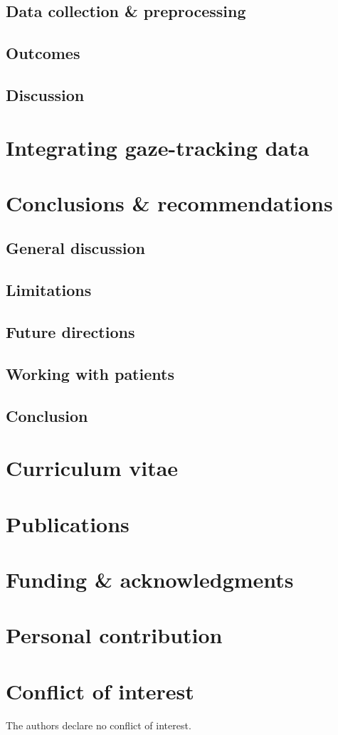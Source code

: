 \section{Data collection \& preprocessing}
\section{Outcomes}
\section{Discussion}

\chapter{Integrating gaze-tracking data}

\chapter{Conclusions \& recommendations}
\section{General discussion}
\section{Limitations}
\section{Future directions}
\section{Working with patients}
\section{Conclusion}



\appendix
\backmatter
\chapter{Curriculum vitae}
\chapter{Publications}
\chapter{Funding \& acknowledgments}
\lipsum[1]
\chapter{Personal contribution}
\lipsum[2]
\chapter{Conflict of interest}
The authors declare no conflict of interest.

